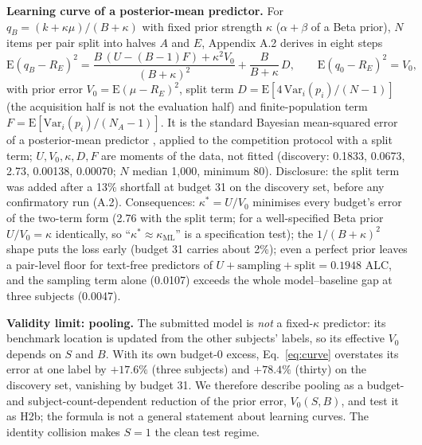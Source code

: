 \documentclass{article}
\begin{document}
\textbf{Learning curve of a posterior-mean predictor.} For $q_B = (k + \kappa\mu)/(B + \kappa)$ with fixed prior
strength $\kappa$ ($\alpha + \beta$ of a Beta prior), $N$ items per pair split into halves $A$ and $E$, Appendix
A.2 derives in eight steps
\begin{equation}
  \mathrm{E}(q_B - R_E)^2 = \frac{B\,(U - (B-1)F) + \kappa^2 V_0}{(B+\kappa)^2} + \frac{B}{B+\kappa}\,D ,
  \qquad \mathrm{E}(q_0 - R_E)^2 = V_0 ,
  \label{eq:curve}
\end{equation}
with prior error $V_0 = \mathrm{E}(\mu - R_E)^2$, split term $D = \mathrm{E}[4\,\mathrm{Var}_i(p_i)/(N-1)]$ (the
acquisition half is not the evaluation half) and finite-population term $F = \mathrm{E}[\mathrm{Var}_i(p_i)/(N_A-1)]$.
It is the standard Bayesian mean-squared error of a posterior-mean predictor \citep{morris1983peb, efron1975stein},
applied to the competition protocol with a split term; $U, V_0, \kappa, D, F$ are moments of the data, not fitted
(discovery: 0.1833, 0.0673, 2.73, 0.00138, 0.00070; $N$ median 1,000, minimum 80). Disclosure: the split term was added
after a 13\% shortfall at budget 31 on the discovery set, before any confirmatory run (A.2). Consequences: $\kappa^* = U/V_0$ minimises every budget's error of the two-term form (2.76 with the split term; for a well-specified Beta prior
$U/V_0 = \kappa$ identically, so ``$\kappa^* \approx \kappa_{\mathrm{ML}}$'' is a specification test); the
$1/(B+\kappa)^2$ shape puts the loss early (budget 31 carries about 2\%); even a perfect prior leaves a pair-level floor
for text-free predictors of $U + \text{sampling} + \text{split} = 0.1948$ ALC, and the sampling term alone (0.0107)
exceeds the whole model--baseline gap at three subjects (0.0047).

\textbf{Validity limit: pooling.} The submitted model is \emph{not} a fixed-$\kappa$ predictor: its benchmark location
is updated from the other subjects' labels, so its effective $V_0$ depends on $S$ and $B$. With its own budget-0 excess,
Eq.~\ref{eq:curve} overstates its error at one label by $+17.6\%$ (three subjects) and $+78.4\%$ (thirty) on the
discovery set, vanishing by budget 31. We therefore describe pooling as a budget- and subject-count-dependent reduction
of the prior error, $V_0(S,B)$, and test it as H2b; the formula is not a general statement about learning curves. The identity
collision makes $S = 1$ the clean test regime.
\end{document}
